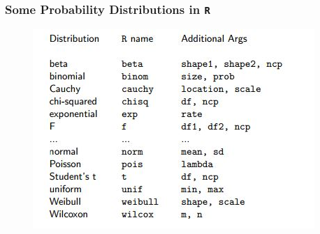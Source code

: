 \documentclass[MAIN.tex]{subfiles}
\begin{document}
\begin{frame}
\frametitle{Some Probability Distributions in \texttt{R}}
	\begin{figure}
\centering
\includegraphics[width=0.9\linewidth]{images/stems}
\end{figure}
\end{frame}
\end{document}
